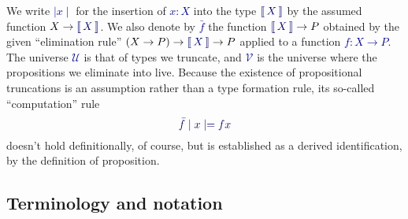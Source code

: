 \documentclass[10pt]{article}
\makeatletter
\newcommand{\db}{\textcolor{darkblue}}
\newcommand\leftcolor[2]{%
  \edef\@tempa{#1}%
  \ifx\@tempa\@empty
    \edef\@tempa{darkblue}%
  \fi
 \mathinner\bgroup\begingroup\color{\@tempa}\left#2\normalcolor%
}
\newcommand\rightcolor[2]{%
  \edef\@tempa{#1}%
  \ifx\@tempa\@empty
    \edef\@tempa{darkblue}%
  \fi
  \color{\@tempa}\right#2\endgroup\egroup%
}
\newcommand{\trunc}[1]{\leftcolor{darkblue}\llbracket\,\db{#1}\,\rightcolor{darkblue}\rrbracket}
\newcommand{\m}[1]{\db{$#1$}}
\newcommand{\M}[1]{\[\db{#1}\]}
\newcommand{\U}{\mathcal{U}}
\newcommand{\V}{\mathcal{V}}
\theoremstyle{definition}
\makeatother
\begin{document}
\begin{enumerate}
  We write \m{\mid x \mid} for the insertion of \m{x:X} into the type
  \m{\trunc{X}} by the assumed function \m{X \to \trunc{X}}.  We also
  denote by \m{\bar{f}} the function \m{\trunc{X} \to P} obtained by
  the given ``elimination rule'' \m{(X \to P) \to \trunc{X} \to P}
  applied to a function \m{f:X \to P}. The universe \m{\U} is that of
  types we truncate, and \m{\V} is the universe where the propositions
  we eliminate into live.  Because the existence of propositional
  truncations is an assumption rather than a type formation rule, its
  so-called ``computation'' rule \M{\bar{f} \mid x \mid = f x} doesn't
  hold definitionally, of course, but is established as a derived
  identification, by the definition of proposition.

\end{enumerate}


\subsection{Terminology and notation}
\label{existence:terminology}
\end{document}
